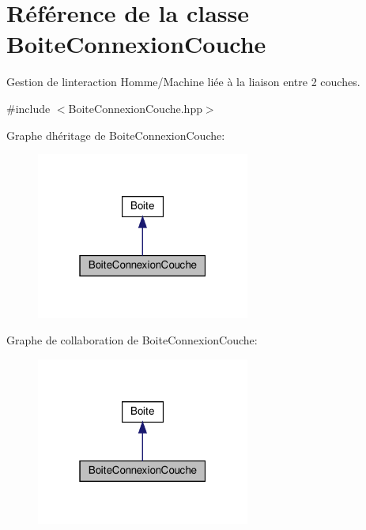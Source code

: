 \hypertarget{class_boite_connexion_couche}{}\section{Référence de la classe Boite\+Connexion\+Couche}
\label{class_boite_connexion_couche}


Gestion de l\textquotesingle{}interaction Homme/\+Machine liée à la liaison entre 2 couches.  




{\ttfamily \#include $<$Boite\+Connexion\+Couche.\+hpp$>$}



Graphe d\textquotesingle{}héritage de Boite\+Connexion\+Couche\+:\nopagebreak
\begin{figure}[H]
\begin{center}
\leavevmode
\includegraphics[width=199pt]{class_boite_connexion_couche__inherit__graph}
\end{center}
\end{figure}


Graphe de collaboration de Boite\+Connexion\+Couche\+:\nopagebreak
\begin{figure}[H]
\begin{center}
\leavevmode
\includegraphics[width=199pt]{class_boite_connexion_couche__coll__graph}
\end{center}
\end{figure}
